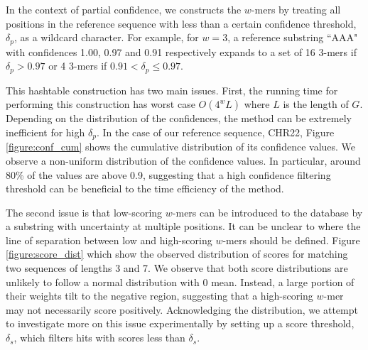 \documentclass{article}
\begin{document}
In the context of partial confidence, we constructs the $w$-mers by treating all positions in the reference sequence with less than a certain confidence threshold, $\delta_p$, as a wildcard character. For example, for $w = 3$, a reference substring ``AAA" with confidences 1.00, 0.97 and 0.91 respectively expands to a set of 16 3-mers if $\delta_p > 0.97$ or 4 3-mers if $0.91 < \delta_p \leq 0.97$. 

This hashtable construction has two main issues. First, the running time for performing this construction has worst case $O(4^wL)$ where $L$ is the length of $G$. Depending on the distribution of the confidences, the method can be extremely inefficient for high $\delta_p$. In the case of our reference sequence, CHR22, Figure \ref{figure:conf_cum} shows the cumulative distribution of its confidence values. We observe a non-uniform distribution of the confidence values. In particular, around 80\% of the values are above 0.9, suggesting that a high confidence filtering threshold can be beneficial to the time efficiency of the method. 

The second issue is that low-scoring $w$-mers can be introduced to the database by a substring with uncertainty at multiple positions. It can be unclear to where the line of separation between low and high-scoring $w$-mers should be defined. Figure \ref{figure:score_dist} which show the observed distribution of scores for matching two sequences of lengths 3 and 7. We observe that both score distributions are unlikely to follow a normal distribution with 0 mean. Instead, a large portion of their weights tilt to the negative region, suggesting that a high-scoring $w$-mer may not necessarily score positively. Acknowledging the distribution, we attempt to investigate more on this issue experimentally by setting up a score threshold, $\delta_s$, which filters hits with scores less than $\delta_s$.
\end{document}
